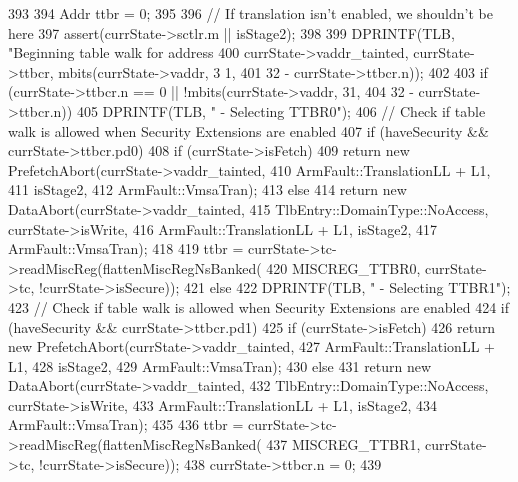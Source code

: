 \begin{DoxyCode}
393 {
394     Addr ttbr = 0;
395 
396     // If translation isn't enabled, we shouldn't be here
397     assert(currState->sctlr.m || isStage2);
398 
399     DPRINTF(TLB, "Beginning table walk for address %
400             currState->vaddr_tainted, currState->ttbcr, mbits(currState->vaddr, 3
      1,
401                                                       32 - currState->ttbcr.n));
402 
403     if (currState->ttbcr.n == 0 || !mbits(currState->vaddr, 31,
404                                           32 - currState->ttbcr.n)) {
405         DPRINTF(TLB, " - Selecting TTBR0\n");
406         // Check if table walk is allowed when Security Extensions are enabled
407         if (haveSecurity && currState->ttbcr.pd0) {
408             if (currState->isFetch)
409                 return new PrefetchAbort(currState->vaddr_tainted,
410                                          ArmFault::TranslationLL + L1,
411                                          isStage2,
412                                          ArmFault::VmsaTran);
413             else
414                 return new DataAbort(currState->vaddr_tainted,
415                         TlbEntry::DomainType::NoAccess, currState->isWrite,
416                                      ArmFault::TranslationLL + L1, isStage2,
417                                      ArmFault::VmsaTran);
418         }
419         ttbr = currState->tc->readMiscReg(flattenMiscRegNsBanked(
420             MISCREG_TTBR0, currState->tc, !currState->isSecure));
421     } else {
422         DPRINTF(TLB, " - Selecting TTBR1\n");
423         // Check if table walk is allowed when Security Extensions are enabled
424         if (haveSecurity && currState->ttbcr.pd1) {
425             if (currState->isFetch)
426                 return new PrefetchAbort(currState->vaddr_tainted,
427                                          ArmFault::TranslationLL + L1,
428                                          isStage2,
429                                          ArmFault::VmsaTran);
430             else
431                 return new DataAbort(currState->vaddr_tainted,
432                         TlbEntry::DomainType::NoAccess, currState->isWrite,
433                                      ArmFault::TranslationLL + L1, isStage2,
434                                      ArmFault::VmsaTran);
435         }
436         ttbr = currState->tc->readMiscReg(flattenMiscRegNsBanked(
437             MISCREG_TTBR1, currState->tc, !currState->isSecure));
438         currState->ttbcr.n = 0;
439     }
}
\end{DoxyCode}
